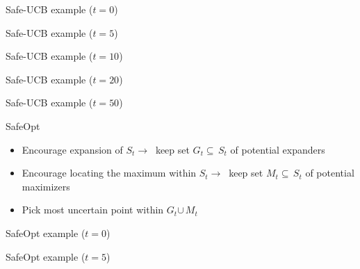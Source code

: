\documentclass[xetex,10pt,mathserif]{beamer}
\newlength\figureheight
\newlength\figurewidth
\newcommand{\localucb}{{\sc\textsf{Safe-UCB}}\xspace}
\newcommand{\cst}{{\color{cyan!70!black}$S_t$}\xspace}
\newcommand{\cgt}{{\color{lime!70!black}$G_t$}\xspace}
\newcommand{\cmt}{{\color{orange!70!black}$M_t$}\xspace}
\begin{document}
\begin{frame}{\localucb example ($t = 0$)}
\centering
\setlength\figurewidth{5in}
\setlength\figureheight{3.5in}

\end{frame}

\begin{frame}{\localucb example ($t = 5$)}
\centering
\setlength\figurewidth{5in}
\setlength\figureheight{3.5in}

\end{frame}

\begin{frame}{\localucb example ($t = 10$)}
\centering
\setlength\figurewidth{5in}
\setlength\figureheight{3.5in}

\end{frame}

\begin{frame}{\localucb example ($t = 20$)}
\centering
\setlength\figurewidth{5in}
\setlength\figureheight{3.5in}

\end{frame}

\begin{frame}{\localucb example ($t = 50$)}
\centering
\setlength\figurewidth{5in}
\setlength\figureheight{3.5in}

\end{frame}

\begin{frame}{SafeOpt}
\begin{itemize}
  \item<1-> Encourage expansion of \cst $\rightarrow\ $ keep set \cgt$\subseteq\,$\cst of potential expanders
  \vspace{2em}
  \item<2-> Encourage locating the maximum within \cst $\rightarrow\ $ keep set \cmt$\subseteq\,$\cst of potential maximizers
  \vspace{2em}
  \item<3-> Pick most uncertain point within \cgt$\cup\,$\cmt
\end{itemize}
\end{frame}

\begin{frame}{SafeOpt example ($t = 0$)}
  \centering
  \setlength\figurewidth{5in}
  \setlength\figureheight{3.5in}
  
\end{frame}

\begin{frame}{SafeOpt example ($t = 5$)}
  \centering
  \setlength\figurewidth{5in}
  \setlength\figureheight{3.5in}
  
\end{frame}
\end{document}
